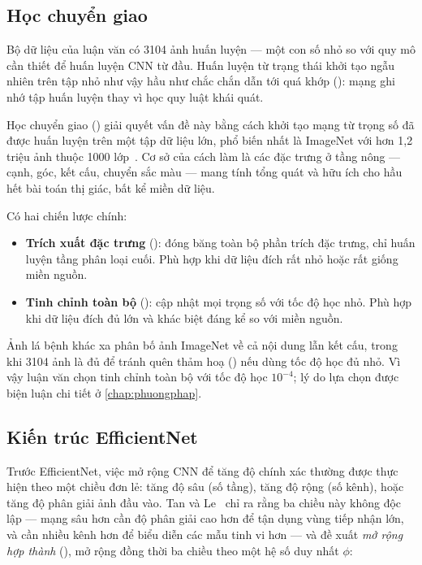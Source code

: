 \subsection{Học chuyển giao}

Bộ dữ liệu của luận văn có \num{3104} ảnh huấn luyện --- một con số nhỏ so với
quy mô cần thiết để huấn luyện CNN từ đầu. Huấn luyện từ trạng thái khởi tạo ngẫu
nhiên trên tập nhỏ như vậy hầu như chắc chắn dẫn tới quá khớp ():
mạng ghi nhớ tập huấn luyện thay vì học quy luật khái quát.

Học chuyển giao () giải quyết vấn đề này bằng cách khởi tạo
mạng từ trọng số đã được huấn luyện trên một tập dữ liệu lớn, phổ biến nhất là
ImageNet với hơn 1,2 triệu ảnh thuộc 1000 lớp~\cite{deng2009imagenet}. Cơ sở của
cách làm là các đặc trưng ở tầng nông --- cạnh, góc, kết cấu, chuyển sắc màu ---
mang tính tổng quát và hữu ích cho hầu hết bài toán thị giác, bất kể miền dữ liệu.

Có hai chiến lược chính:

\begin{itemize}
    \item \textbf{Trích xuất đặc trưng} (): đóng băng toàn
          bộ phần trích đặc trưng, chỉ huấn luyện tầng phân loại cuối. Phù hợp khi
          dữ liệu đích rất nhỏ hoặc rất giống miền nguồn.
    \item \textbf{Tinh chỉnh toàn bộ} (): cập nhật mọi trọng
          số với tốc độ học nhỏ. Phù hợp khi dữ liệu đích đủ lớn và khác biệt đáng
          kể so với miền nguồn.
\end{itemize}

Ảnh lá bệnh khác xa phân bố ảnh ImageNet về cả nội dung lẫn kết cấu, trong khi
\num{3104} ảnh là đủ để tránh quên thảm hoạ () nếu
dùng tốc độ học đủ nhỏ. Vì vậy luận văn chọn tinh chỉnh toàn bộ với tốc độ học
$10^{-4}$; lý do lựa chọn được biện luận chi tiết ở \cref{chap:phuongphap}.

\subsection{Kiến trúc EfficientNet}

Trước EfficientNet, việc mở rộng CNN để tăng độ chính xác thường được thực hiện
theo một chiều đơn lẻ: tăng độ sâu (số tầng), tăng độ rộng (số kênh), hoặc tăng độ
phân giải ảnh đầu vào. Tan và Le~\cite{tan2019efficientnet} chỉ ra rằng ba chiều
này không độc lập --- mạng sâu hơn cần độ phân giải cao hơn để tận dụng vùng tiếp
nhận lớn, và cần nhiều kênh hơn để biểu diễn các mẫu tinh vi hơn --- và đề xuất
\emph{mở rộng hợp thành} (), mở rộng đồng thời ba chiều theo
một hệ số duy nhất $\phi$:

